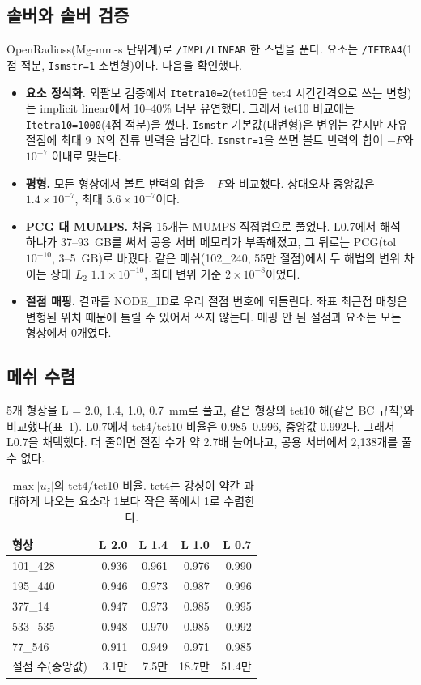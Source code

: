 \documentclass[11pt]{article}
\begin{document}
\subsection{솔버와 솔버 검증}

OpenRadioss(Mg-mm-s 단위계)로 \texttt{/IMPL/LINEAR} 한 스텝을 푼다.
요소는 \texttt{/TETRA4}(1점 적분, \texttt{Ismstr=1} 소변형)이다. 다음을 확인했다.
\begin{itemize}
\item \textbf{요소 정식화.} 외팔보 검증에서 \texttt{Itetra10=2}(tet10을 tet4 시간간격으로
      쓰는 변형)는 implicit linear에서 10--40\% 너무 유연했다. 그래서 tet10 비교에는
      \texttt{Itetra10=1000}(4점 적분)을 썼다. \texttt{Ismstr} 기본값(대변형)은
      변위는 같지만 자유 절점에 최대 9~N의 잔류 반력을 남긴다. \texttt{Ismstr=1}을
      쓰면 볼트 반력의 합이 $-F$와 $10^{-7}$ 이내로 맞는다.
\item \textbf{평형.} 모든 형상에서 볼트 반력의 합을 $-F$와 비교했다. 상대오차 중앙값은
      $1.4\times10^{-7}$, 최대 $5.6\times10^{-7}$이다.
\item \textbf{PCG 대 MUMPS.} 처음 15개는 MUMPS 직접법으로 풀었다. L0.7에서 해석 하나가
      37--93~GB를 써서 공용 서버 메모리가 부족해졌고, 그 뒤로는 PCG(tol $10^{-10}$,
      3--5~GB)로 바꿨다. 같은 메쉬(102\_240, 55만 절점)에서 두 해법의 변위 차이는
      상대 $L_2$ $1.1\times10^{-10}$, 최대 변위 기준 $2\times10^{-8}$이었다.
\item \textbf{절점 매핑.} 결과를 NODE\_ID로 우리 절점 번호에 되돌린다. 좌표 최근접
      매칭은 변형된 위치 때문에 틀릴 수 있어서 쓰지 않는다. 매핑 안 된 절점과
      요소는 모든 형상에서 0개였다.
\end{itemize}

\subsection{메쉬 수렴}

5개 형상을 L = 2.0, 1.4, 1.0, 0.7~mm로 풀고, 같은 형상의 tet10 해(같은 BC 규칙)와
비교했다(표~\ref{tab:conv}). L0.7에서 tet4/tet10 비율은 0.985--0.996, 중앙값
0.992다. 그래서 L0.7을 채택했다. 더 줄이면 절점 수가 약 2.7배 늘어나고,
공용 서버에서 2,138개를 풀 수 없다.

\begin{table}[h]
\centering\small
\begin{tabular}{@{}lrrrr@{}}
\toprule
형상 & L 2.0 & L 1.4 & L 1.0 & L 0.7 \\
\midrule
101\_428 & 0.936 & 0.961 & 0.976 & 0.990 \\
195\_440 & 0.946 & 0.973 & 0.987 & 0.996 \\
377\_14  & 0.947 & 0.973 & 0.985 & 0.995 \\
533\_535 & 0.948 & 0.970 & 0.985 & 0.992 \\
77\_546  & 0.911 & 0.949 & 0.971 & 0.985 \\
\midrule
절점 수(중앙값) & 3.1만 & 7.5만 & 18.7만 & 51.4만 \\
\bottomrule
\end{tabular}
\caption{$\max|u_z|$의 tet4/tet10 비율. tet4는 강성이 약간 과대하게 나오는 요소라 1보다 작은
쪽에서 1로 수렴한다.}
\label{tab:conv}
\end{table}
\end{document}
